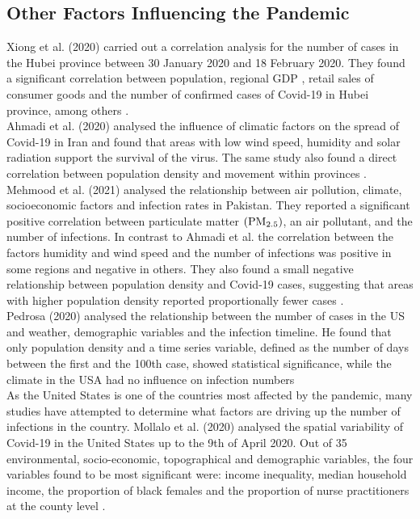 \subsection*{Other Factors Influencing the Pandemic}
Xiong et al. (2020) carried out a correlation analysis for the number of cases in the Hubei province between 30 January 2020 and 18 February 2020. They found a significant correlation between population, regional GDP , retail sales of consumer goods and the number of confirmed cases of Covid-19 in Hubei province, among others \autocite[][]{xiong2020spatial}. \\
Ahmadi et al. (2020) analysed the influence of climatic factors on the spread of Covid-19 in Iran and found that areas with low wind speed, humidity and solar radiation support the survival of the virus. The same study also found a direct correlation between population density and movement within provinces \autocite[][]{ahmadi2020investigation}. Mehmood et al. (2021) analysed the relationship between air pollution, climate, socioeconomic factors and infection rates in Pakistan. They reported a significant positive correlation between particulate matter $\left(\hbox{PM}_{2.5}\right)$, an air pollutant, and the number of infections. In contrast to Ahmadi et al. the correlation between the factors humidity and wind speed and the number of infections was positive in some regions and negative in others. They also found a small negative relationship between population density and Covid-19 cases, suggesting that areas with higher population density reported proportionally fewer cases \autocite[][]{mehmood2021spatiotemporal}. \\
Pedrosa (2020) analysed the relationship between the number of cases in the US and weather, demographic variables and the infection timeline. He found that only population density and a time series variable, defined as the number of days between the first and the 100th case, showed statistical significance, while the climate in the USA had no influence on infection numbers \autocite[][]{pedrosa2020dynamics} \\
As the United States is one of the countries most affected by the pandemic, many studies have attempted to determine what factors are driving up the number of infections in the country. Mollalo et al. (2020) analysed the spatial variability of Covid-19 in the United States up to the 9th of April 2020. Out of 35 environmental, socio-economic, topographical and demographic variables, the four variables found to be most significant were: income inequality, median household income, the proportion of black females and the proportion of nurse practitioners at the county level \autocite[][]{mollalo2020gis}. \\
